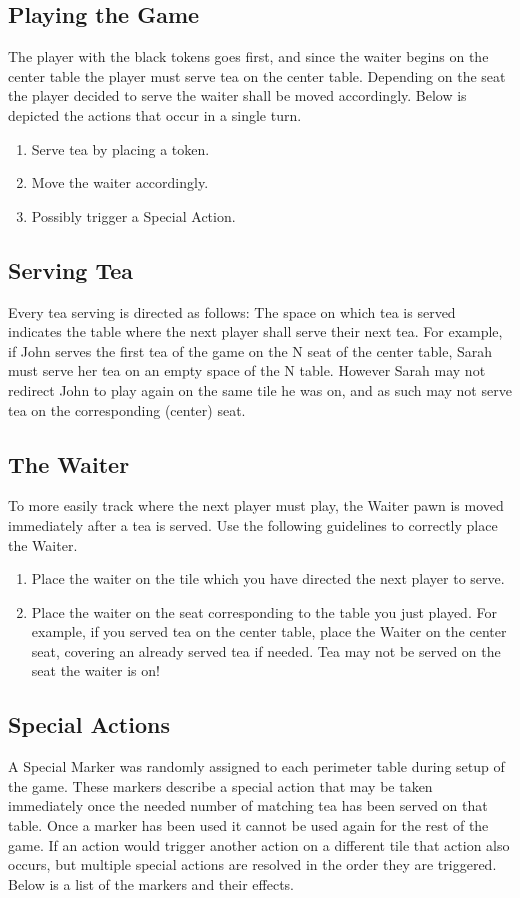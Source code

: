 \documentclass[a4paper]{article}
\begin{document}
\subsection{Playing​ ​the​ ​Game}
The player with the black tokens goes first, and since the waiter begins on the center table
the player must serve tea on the center table. Depending on the seat the player decided to serve
the waiter shall be moved accordingly. Below is depicted the actions that occur in a single turn.
\begin{enumerate}
\item Serve tea by placing a token.
\item Move the waiter accordingly.
\item Possibly trigger a Special Action.
\end{enumerate}

\subsection{Serving​ ​Tea}
Every tea serving is directed as follows: The space on which tea is served indicates the
table where the next player shall serve their next tea. For example, if John serves the first tea of
the game on the N seat of the center table, Sarah must serve her tea on an empty space of the N
table. However Sarah may not redirect John to play again on the same tile he was on, and as such
may not serve tea on the corresponding (center) seat.

\subsection{The​ ​Waiter}
To more easily track where the next player must play, the Waiter pawn is moved
immediately after a tea is served. Use the following guidelines to correctly place the Waiter.

\begin{enumerate}
\item Place the waiter on the tile which you have directed the next player to serve.
\item Place the waiter on the seat corresponding to the table you just played. For example, if
you served tea on the center table, place the Waiter on the center seat, covering an
already served tea if needed. Tea may not be served on the seat the waiter is on!
\end{enumerate}

\subsection{Special​ ​Actions}
A Special Marker was randomly assigned to each perimeter table during setup of the
game. These markers describe a special action that may be taken immediately once the needed
number of matching tea has been served on that table. Once a marker has been used it cannot be
used again for the rest of the game. If an action would trigger another action on a different tile
that action also occurs, but multiple special actions are resolved in the order they are triggered.
Below is a list of the markers and their effects.
\end{document}
